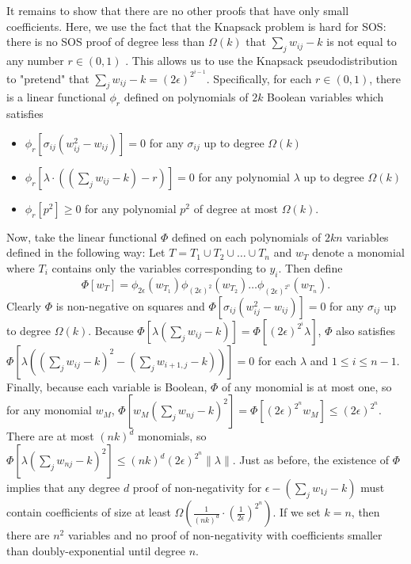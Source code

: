 It remains to show that there are no other proofs that have only small coefficients. Here, we use the fact that the Knapsack problem is hard for SOS: there is no SOS proof of degree less than $\Omega(k)$ that $\sum_j w_{ij} - k$ is not equal to any number $r \in (0,1)$ \cite{}. This allows us to use the Knapsack pseudodistribution to "pretend" that $\sum_j w_{ij} - k = (2\epsilon)^{2^{i-1}}$. Specifically, for each $r \in (0,1)$, there is a linear functional $\phi_r$ defined on polynomials of $2k$ Boolean variables which satisfies
\begin{itemize}
\item $\phi_r[\sigma_{ij}(w_{ij}^2 - w_{ij})] = 0$ for any $\sigma_{ij}$ up to degree $\Omega(k)$
\item $\phi_r[\lambda\cdot((\sum_j w_{ij} - k) - r)] = 0$ for any polynomial $\lambda$ up to degree $\Omega(k)$
\item $\phi_r[p^2] \geq 0$ for any polynomial $p^2$ of degree at most $\Omega(k)$.
\end{itemize}
Now, take the linear functional $\Phi$ defined on each polynomials of $2kn$ variables defined in the following way: Let $T = T_1 \cup T_2 \cup \dots \cup T_n$ and $w_T$ denote a monomial where $T_i$ contains only the variables corresponding to $y_i$. Then define
\[\Phi[w_T] = \phi_{2\epsilon}(w_{T_1})\phi_{(2\epsilon)^2}(w_{T_2})\dots\phi_{(2\epsilon)^{2^n}}(w_{T_n}).\]
Clearly $\Phi$ is non-negative on squares and $\Phi[\sigma_{ij}(w_{ij}^2-w_{ij})] = 0$ for any $\sigma_{ij}$ up to degree $\Omega(k)$. Because $\Phi[\lambda(\sum_j w_{ij} - k)] = \Phi[(2\epsilon)^{2^i}\lambda]$, $\Phi$ also satisfies $\Phi[\lambda((\sum_j w_{ij}-k)^2 - (\sum_j w_{i+1,j} - k))] = 0$ for each $\lambda$ and $1 \leq i \leq n-1$. Finally, because each variable is Boolean, $\Phi$ of any monomial is at most one, so for any monomial $w_M$, $\Phi[w_M(\sum_j w_{nj} - k)^2] = \Phi[(2\epsilon)^{2^n} w_M] \leq (2\epsilon)^{2^n}$. There are at most $(nk)^d$ monomials, so $\Phi[\lambda(\sum_j w_{nj} - k)^2] \leq (nk)^d(2\epsilon)^{2^n}\|\lambda\|$. Just as before, the existence of $\Phi$ implies that any degree $d$ proof of non-negativity for $\epsilon - (\sum_j w_{1j} - k)$ must contain coefficients of size at least $\Omega(\frac{1}{(nk)^d} \cdot \left(\frac{1}{2\epsilon}\right)^{2^n})$. If we set $k = n$, then there are $n^2$ variables and no proof of non-negativity with coefficients smaller than doubly-exponential until degree $n$. 

